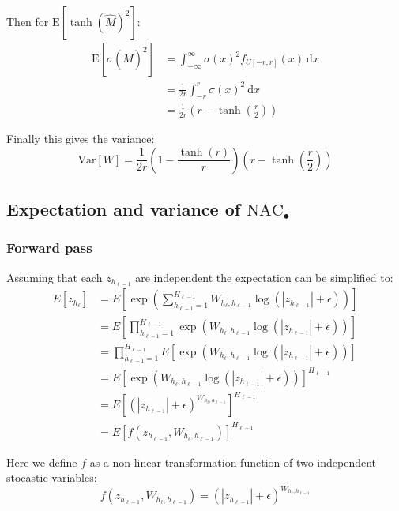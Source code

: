 Then for $\mathrm{E}[\tanh(\hat{M})^2]$:
\begin{equation}
\begin{aligned}
\mathrm{E}[\sigma(\hat{M})^2] &= \int_{-\infty}^{\infty} \sigma(x)^2 f_{U[-r, r]}(x)\ \mathrm{d}x \\
&= \frac{1}{2r} \int_{-r}^{r} \sigma(x)^2\ \mathrm{d}x \\
&= \frac{1}{2r} \left(r - \tanh\left(\frac{r}{2}\right)\right)
\end{aligned}
\end{equation}

Finally this gives the variance:
\begin{equation}
\mathrm{Var}[W] = \frac{1}{2r} \left(1 - \frac{\tanh(r)}{r}\right) \left(r - \tanh\left(\frac{r}{2}\right)\right)
\end{equation}

\subsection{Expectation and variance of $\mathrm{NAC}_{\bullet}$}
\subsubsection{Forward pass}
Assuming that each $z_{h_{\ell-1}}$ are independent the expectation can be simplified to:
\begin{equation}
\begin{aligned}
E[z_{h_\ell}] &= E\left[\exp\left(\sum_{h_{\ell-1}=1}^{H_{\ell-1}} W_{h_{\ell}, h_{\ell-1}} \log(|z_{h_{\ell-1}}| + \epsilon) \right)\right] \\
&= E\left[\prod_{h_{\ell-1}=1}^{H_{\ell-1}} \exp(W_{h_{\ell}, h_{\ell-1}} \log(|z_{h_{\ell-1}}| + \epsilon)) \right] \\
&= \prod_{h_{\ell-1}=1}^{H_{\ell-1}} E[\exp(W_{h_{\ell}, h_{\ell-1}} \log(|z_{h_{\ell-1}}| + \epsilon))] \\
&= E[\exp(W_{h_{\ell}, h_{\ell-1}} \log(|z_{h_{\ell-1}}| + \epsilon))]^{H_{\ell-1}} \\
&= E\left[(|z_{h_{\ell-1}}| + \epsilon)^{W_{h_{\ell}, h_{\ell-1}}}\right]^{H_{\ell-1}} \\
&= E\left[f(z_{h_{\ell-1}}, W_{h_{\ell}, h_{\ell-1}})\right]^{H_{\ell-1}}
\end{aligned}
\end{equation}

Here we define $f$ as a non-linear transformation function of two independent stocastic variables:
\begin{equation}
f(z_{h_{\ell-1}}, W_{h_{\ell}, h_{\ell-1}}) = (|z_{h_{\ell-1}}| + \epsilon)^{W_{h_{\ell}, h_{\ell-1}}}
\end{equation}

